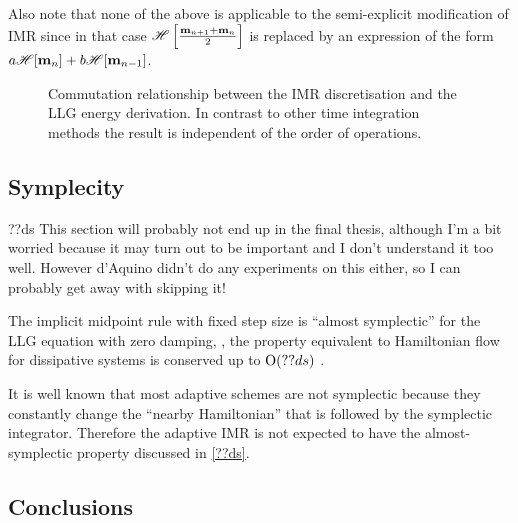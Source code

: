 Also note that none of the above is applicable to the semi-explicit modification of IMR since in that case $\mathscr{H} \left[ \frac{\boldsymbol{\mathrm{m}}_{n+1} + \boldsymbol{\mathrm{m}}_n}{2} \right]$ is replaced by an expression of the form $a\mathscr{H} {\left[ \boldsymbol{\mathrm{m}}_n \right]} + b\mathscr{H} {\left[ \boldsymbol{\mathrm{m}}_{n-1} \right]}$.

\begin{figure}
  \centering
  \caption{Commutation relationship between the IMR discretisation and the LLG energy derivation.
In contrast to other time integration methods the result is independent of the order of operations.}
\label{fig:commutation-imr-energy}
\end{figure}


\subsection{Symplecity}

??ds This section will probably not end up in the final thesis, although I'm a bit worried because it may turn out to be important and I don't understand it too well.
However d'Aquino didn't do any experiments on this either, so I can probably get away with skipping it!

The implicit midpoint rule with fixed step size is ``almost symplectic'' for the LLG equation with zero damping, , \ie the property equivalent to Hamiltonian flow for  dissipative systems is conserved up to $\mathrm{O}{\left( ??ds \right)}$ \cite{DAquino2005} \cite{Austin1993}.

It is well known that most adaptive schemes are not symplectic \cite[91]{Iserles2009} because they constantly change the ``nearby Hamiltonian'' that is followed by the symplectic integrator.
Therefore the adaptive IMR is not expected to have the almost-symplectic property discussed in \cref{??ds}.


\subsection{Conclusions}

